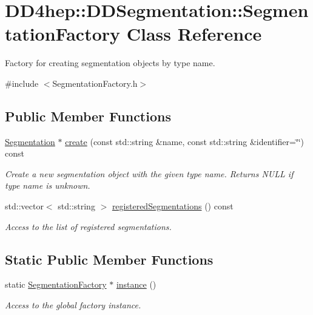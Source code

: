 \hypertarget{class_d_d4hep_1_1_d_d_segmentation_1_1_segmentation_factory}{}\section{D\+D4hep\+:\+:D\+D\+Segmentation\+:\+:Segmentation\+Factory Class Reference}
\label{class_d_d4hep_1_1_d_d_segmentation_1_1_segmentation_factory}


Factory for creating segmentation objects by type name.  




{\ttfamily \#include $<$Segmentation\+Factory.\+h$>$}

\subsection*{Public Member Functions}
\begin{DoxyCompactItemize}
\item 
\hyperlink{class_d_d4hep_1_1_d_d_segmentation_1_1_segmentation}{Segmentation} $\ast$ \hyperlink{class_d_d4hep_1_1_d_d_segmentation_1_1_segmentation_factory_ac0bc19db7946436c3be4a33fa70de8a0}{create} (const std\+::string \&name, const std\+::string \&identifier=\char`\"{}\char`\"{}) const
\begin{DoxyCompactList}\small\item\em Create a new segmentation object with the given type name. Returns N\+U\+LL if type name is unknown. \end{DoxyCompactList}\item 
std\+::vector$<$ std\+::string $>$ \hyperlink{class_d_d4hep_1_1_d_d_segmentation_1_1_segmentation_factory_ac1841ece32e4c1d879088ab6729e6a7d}{registered\+Segmentations} () const
\begin{DoxyCompactList}\small\item\em Access to the list of registered segmentations. \end{DoxyCompactList}\end{DoxyCompactItemize}
\subsection*{Static Public Member Functions}
\begin{DoxyCompactItemize}
\item 
static \hyperlink{class_d_d4hep_1_1_d_d_segmentation_1_1_segmentation_factory}{Segmentation\+Factory} $\ast$ \hyperlink{class_d_d4hep_1_1_d_d_segmentation_1_1_segmentation_factory_a92954fdbd0bc642e5b594ef7f4ee3cfc}{instance} ()
\begin{DoxyCompactList}\small\item\em Access to the global factory instance. \end{DoxyCompactList}\end{DoxyCompactItemize}
